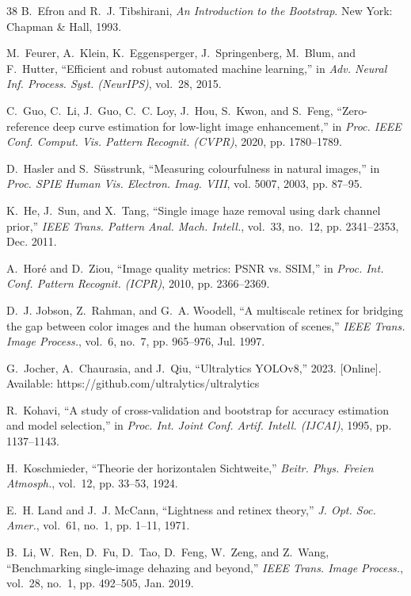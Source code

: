 \documentclass[journal]{IEEEtran}
\begin{document}
\begin{thebibliography}{38}
B.~Efron and R.~J. Tibshirani, \emph{An Introduction to the Bootstrap}. New York: Chapman \& Hall, 1993.

M.~Feurer, A.~Klein, K.~Eggensperger, J.~Springenberg, M.~Blum, and F.~Hutter, ``Efficient and robust automated machine learning,'' in \emph{Adv. Neural Inf. Process. Syst. (NeurIPS)}, vol.~28, 2015.

C.~Guo, C.~Li, J.~Guo, C.~C. Loy, J.~Hou, S.~Kwon, and S.~Feng, ``Zero-reference deep curve estimation for low-light image enhancement,'' in \emph{Proc. IEEE Conf. Comput. Vis. Pattern Recognit. (CVPR)}, 2020, pp. 1780--1789.

D.~Hasler and S.~S{\"u}sstrunk, ``Measuring colourfulness in natural images,'' in \emph{Proc. SPIE Human Vis. Electron. Imag. VIII}, vol. 5007, 2003, pp. 87--95.

K.~He, J.~Sun, and X.~Tang, ``Single image haze removal using dark channel prior,'' \emph{IEEE Trans. Pattern Anal. Mach. Intell.}, vol.~33, no.~12, pp. 2341--2353, Dec. 2011.

A.~Hor{\'e} and D.~Ziou, ``Image quality metrics: PSNR vs. SSIM,'' in \emph{Proc. Int. Conf. Pattern Recognit. (ICPR)}, 2010, pp. 2366--2369.

D.~J. Jobson, Z.~Rahman, and G.~A. Woodell, ``A multiscale retinex for bridging the gap between color images and the human observation of scenes,'' \emph{IEEE Trans. Image Process.}, vol.~6, no.~7, pp. 965--976, Jul. 1997.

G.~Jocher, A.~Chaurasia, and J.~Qiu, ``Ultralytics YOLOv8,'' 2023. [Online]. Available: https://github.com/ultralytics/ultralytics

R.~Kohavi, ``A study of cross-validation and bootstrap for accuracy estimation and model selection,'' in \emph{Proc. Int. Joint Conf. Artif. Intell. (IJCAI)}, 1995, pp. 1137--1143.

H.~Koschmieder, ``Theorie der horizontalen Sichtweite,'' \emph{Beitr. Phys. Freien Atmosph.}, vol.~12, pp. 33--53, 1924.

E.~H. Land and J.~J. McCann, ``Lightness and retinex theory,'' \emph{J. Opt. Soc. Amer.}, vol.~61, no.~1, pp. 1--11, 1971.

B.~Li, W.~Ren, D.~Fu, D.~Tao, D.~Feng, W.~Zeng, and Z.~Wang, ``Benchmarking single-image dehazing and beyond,'' \emph{IEEE Trans. Image Process.}, vol.~28, no.~1, pp. 492--505, Jan. 2019.


\end{thebibliography}
\end{document}
